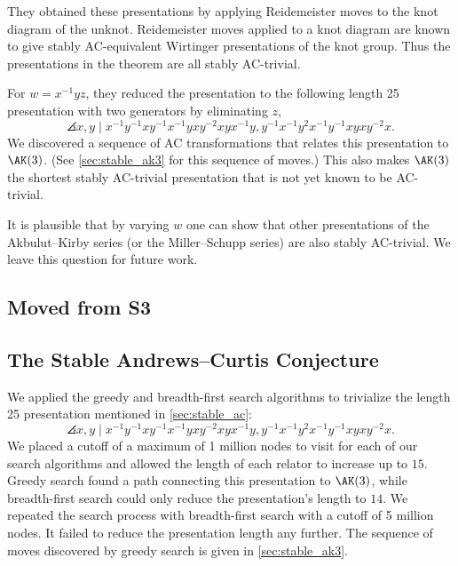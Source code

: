 They obtained these presentations by applying Reidemeister moves to the knot diagram of the unknot.
Reidemeister moves applied to a knot diagram are known to give stably AC-equivalent Wirtinger presentations of the knot group.
Thus the presentations in the theorem are all stably AC-trivial.

For $w = x^{-1}yz$, they reduced the presentation to the following length 25 presentation with two generators by eliminating $z$,
\[
\angles{ x, y \mid
	x^{-1}y^{-1}xy^{-1}x^{-1}yxy^{-2}xyx^{-1}y,
	y^{-1}x^{-1}y^2x^{-1}y^{-1}xyxy^{-2}x }.
\]
We discovered a sequence of AC transformations that relates this presentation to $\AK(3)$.
(See \autoref{sec:stable_ak3} for this sequence of moves.)
This also makes $\AK(3)$ the shortest stably AC-trivial presentation that is not yet known to be AC-trivial.


It is plausible that by varying $w$ one can show that other presentations of the Akbulut--Kirby series (or the Miller--Schupp series) are also stably AC-trivial.
We leave this question for future work.

\subsection{Moved from S3}

\subsection{The Stable Andrews--Curtis Conjecture}

We applied the greedy and breadth-first search algorithms to trivialize the length 25 presentation mentioned in \autoref{sec:stable_ac}:
\[
\angles{ x, y \mid
	x^{-1}y^{-1}xy^{-1}x^{-1}yxy^{-2}xyx^{-1}y,
	y^{-1}x^{-1}y^2x^{-1}y^{-1}xyxy^{-2}x }.
\]
We placed a cutoff of a maximum of 1 million nodes to visit for each of our search algorithms and allowed the length of each relator to increase up to $15$.
Greedy search found a path connecting this presentation to $\AK(3)$, while breadth-first search could only reduce the presentation's length to $14$.
We repeated the search process with breadth-first search with a cutoff of 5 million nodes.
It failed to reduce the presentation length any further.
The sequence of moves discovered by greedy search is given in \autoref{sec:stable_ak3}.

